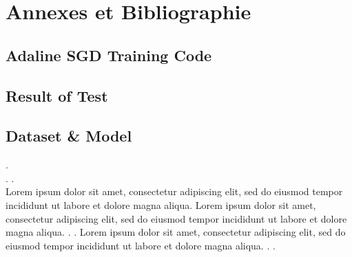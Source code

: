 \appendix


\part{Annexes et Bibliographie} %



\chapter{Adaline SGD Training Code}
\chapter{Result of Test}
\chapter{Dataset \& Model}
	\lipsum[1]. \cite{ahadjitse2013reconnaissance} \\
	\lipsum[3]
	\cite{deepa2021ai}.
	\cite{bottou2012stochastic}.
	\cite{framling2004scaled}\\
	
	Lorem ipsum dolor sit amet, consectetur adipiscing elit, sed do eiusmod tempor incididunt ut labore et dolore magna aliqua.
	\cite{amari1993backpropagation}
	Lorem ipsum dolor sit amet, consectetur adipiscing elit, sed do eiusmod tempor incididunt ut labore et dolore magna aliqua.
	\cite{friess1999kernel}.
	\cite{bishop2006pattern}.
	Lorem ipsum dolor sit amet, consectetur adipiscing elit, sed do eiusmod tempor incididunt ut labore et dolore magna aliqua.
	\cite{wijnhoven2010fast}.
	\cite{akheel2021stochastic}
	\cite{ml2008python}
	\cite{antoine2018apprentissage}
	\cite{ibm2017cv}
	\cite{knuth:1974}.
	



%
%

